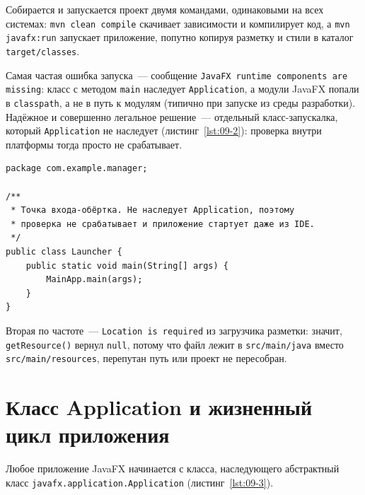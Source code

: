 Собирается и запускается проект двумя командами, одинаковыми на всех системах:
\texttt{mvn clean compile} скачивает зависимости и компилирует код, а
\texttt{mvn javafx:run} запускает приложение, попутно копируя разметку и стили в
каталог \texttt{target/classes}.

Самая частая ошибка запуска~--- сообщение
\texttt{JavaFX runtime components are missing}: класс с методом \texttt{main}
наследует \texttt{Application}, а модули JavaFX попали в \texttt{classpath}, а не
в путь к модулям (типично при запуске из среды разработки). Надёжное и
совершенно легальное решение~--- отдельный класс-запускалка, который
\texttt{Application} не наследует (листинг~\ref{lst:09-2}): проверка внутри
платформы тогда просто не срабатывает.

\begin{listing}[H]
\begin{verbatim}
package com.example.manager;

/**
 * Точка входа-обёртка. Не наследует Application, поэтому
 * проверка не срабатывает и приложение стартует даже из IDE.
 */
public class Launcher {
    public static void main(String[] args) {
        MainApp.main(args);
    }
}
\end{verbatim}
\caption{Класс-запускалка в обход проверки JavaFX}
\label{lst:09-2}
\end{listing}

Вторая по частоте~--- \texttt{Location is required} из загрузчика разметки:
значит, \texttt{getResource()} вернул \texttt{null}, потому что файл лежит в
\texttt{src/main/java} вместо \texttt{src/main/resources}, перепутан путь или
проект не пересобран.

\section{Класс Application и жизненный цикл приложения}

Любое приложение JavaFX начинается с класса, наследующего абстрактный класс
\texttt{javafx.application.Application} (листинг~\ref{lst:09-3}).

